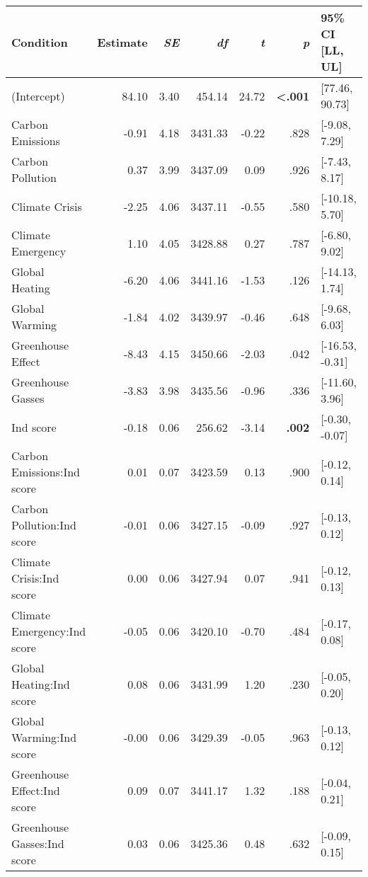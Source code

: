 \begin{table}[ht]
\centering
\begin{tabular}{lrrrrrl}
  \hline
Condition & Estimate & \textit{SE} & \textit{df} & \textit{t} & \textit{p} & 95\% CI [LL, UL] \\ 
  \hline
(Intercept) & 84.10 & 3.40 & 454.14 & 24.72 & \textbf{\textless  .001} & [77.46, 90.73] \\ 
  Carbon Emissions & -0.91 & 4.18 & 3431.33 & -0.22 & .828 & [-9.08, 7.29] \\ 
  Carbon Pollution & 0.37 & 3.99 & 3437.09 & 0.09 & .926 & [-7.43, 8.17] \\ 
  Climate Crisis & -2.25 & 4.06 & 3437.11 & -0.55 & .580 & [-10.18, 5.70] \\ 
  Climate Emergency & 1.10 & 4.05 & 3428.88 & 0.27 & .787 & [-6.80, 9.02] \\ 
  Global Heating & -6.20 & 4.06 & 3441.16 & -1.53 & .126 & [-14.13, 1.74] \\ 
  Global Warming & -1.84 & 4.02 & 3439.97 & -0.46 & .648 & [-9.68, 6.03] \\ 
  Greenhouse Effect & -8.43 & 4.15 & 3450.66 & -2.03 & .042 & [-16.53, -0.31] \\ 
  Greenhouse Gasses & -3.83 & 3.98 & 3435.56 & -0.96 & .336 & [-11.60, 3.96] \\ 
  Ind score & -0.18 & 0.06 & 256.62 & -3.14 & \textbf{.002} & [-0.30, -0.07] \\ 
  Carbon Emissions:Ind score & 0.01 & 0.07 & 3423.59 & 0.13 & .900 & [-0.12, 0.14] \\ 
  Carbon Pollution:Ind score & -0.01 & 0.06 & 3427.15 & -0.09 & .927 & [-0.13, 0.12] \\ 
  Climate Crisis:Ind score & 0.00 & 0.06 & 3427.94 & 0.07 & .941 & [-0.12, 0.13] \\ 
  Climate Emergency:Ind score & -0.05 & 0.06 & 3420.10 & -0.70 & .484 & [-0.17, 0.08] \\ 
  Global Heating:Ind score & 0.08 & 0.06 & 3431.99 & 1.20 & .230 & [-0.05, 0.20] \\ 
  Global Warming:Ind score & -0.00 & 0.06 & 3429.39 & -0.05 & .963 & [-0.13, 0.12] \\ 
  Greenhouse Effect:Ind score & 0.09 & 0.07 & 3441.17 & 1.32 & .188 & [-0.04, 0.21] \\ 
  Greenhouse Gasses:Ind score & 0.03 & 0.06 & 3425.36 & 0.48 & .632 & [-0.09, 0.15] \\ 
   \hline
\end{tabular}
\end{table}
